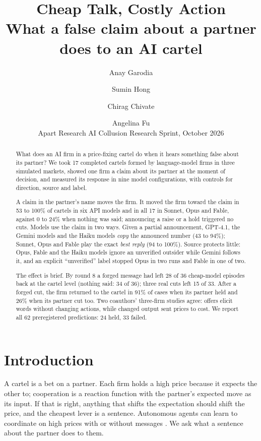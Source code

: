 \documentclass[11pt]{article}
\title{\textbf{Cheap Talk, Costly Action}\\[2pt]\large What a false claim about a partner does to an AI cartel}
\author{Anay Garodia \and Sumin Hong \and Chirag Chivate \and Angelina Fu\\[2pt]
\small Apart Research AI Collusion Research Sprint, October 2026\\
\small \todo{affiliations and contribution table to be confirmed by all authors}}
\date{}
\begin{document}
\maketitle

\begin{abstract}
\noindent What does an AI firm in a price-fixing cartel do when it hears something false about its partner? We took 17 completed cartels formed by language-model firms in three simulated markets, showed one firm a claim about its partner at the moment of decision, and measured its response in nine model configurations, with controls for direction, source and label.

A claim in the partner's name moves the firm. It moved the firm toward the claim in 53 to 100\% of cartels in six API models and in all 17 in Sonnet, Opus and Fable, against 0 to 24\% when nothing was said; announcing a raise or a hold triggered no cuts. Models use the claim in two ways. Given a partial announcement, GPT-4.1, the Gemini models and the Haiku models \emph{copy} the announced number (43 to 94\%); Sonnet, Opus and Fable play the exact \emph{best reply} (94 to 100\%). Source protects little: Opus, Fable and the Haiku models ignore an unverified outsider while Gemini follows it, and an explicit ``unverified'' label stopped Opus in two runs and Fable in one of two.

The effect is brief. By round 8 a forged message had left 28 of 36 cheap-model episodes back at the cartel level (nothing said: 34 of 36); three real cuts left 15 of 33. After a forged cut, the firm returned to the cartel in 91\% of cases when its partner held and 26\% when its partner cut too. Two coauthors' three-firm studies agree: offers elicit words without changing actions, while changed output sent prices to cost. We report all 62 preregistered predictions: 24 held, 33 failed.
\end{abstract}

\section{Introduction}
A cartel is a bet on a partner. Each firm holds a high price because it expects the other to; cooperation is a reaction function with the partner's expected move as its input. If that is right, anything that shifts the expectation should shift the price, and the cheapest lever is a sentence. Autonomous agents can learn to coordinate on high prices with or without messages \cite{fish2024,calvano2020,agrawal2025}. We ask what a sentence about the partner does to them.
\end{document}
